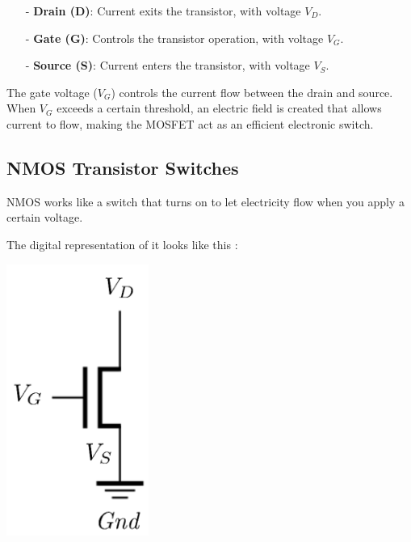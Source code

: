 \documentclass[12pt,openany, tikz,border=10pt]{book}
\begin{document}
\begin{itemize}
    \item[-] \textbf{Drain (D)}: Current exits the transistor, with voltage \( V_D\).
    \item[-] \textbf{Gate (G)}: Controls the transistor operation, with voltage \( V_G\).
    \item[-] \textbf{Source (S)}: Current enters the transistor, with voltage \( V_S\).
\end{itemize}



The gate voltage (\( V_G \)) controls the current flow between the drain and source. When \( V_G \) exceeds a certain threshold, an electric field is created that allows current to flow, making the MOSFET act as an efficient electronic switch.

\subsection{NMOS Transistor Switches}
\small NMOS works like a switch that turns on to let electricity flow when you apply a certain voltage.

The digital representation of it looks like this :

\begin{center}

    \begin{minipage}[c]{0.35\textwidth} %

        \centering
        \includegraphics[width=0.35\textwidth]{circuits/9.1.1.png} 
    \end{minipage}
    \end{center}
\end{document}
